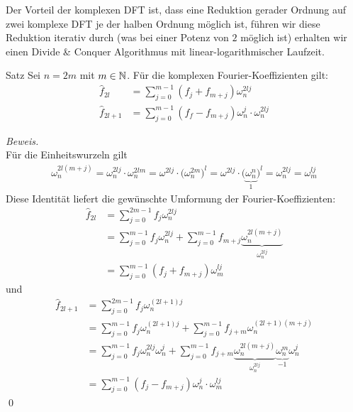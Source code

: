 Der Vorteil der komplexen DFT ist, dass eine Reduktion gerader Ordnung auf zwei komplexe DFT je der halben
Ordnung möglich ist, führen wir diese Reduktion iterativ durch (was bei einer Potenz von $2$ möglich ist) 
erhalten wir einen Divide \& Conquer Algorithmus mit linear-logarithmischer Laufzeit.

\begin{colbox}{Satz}
  Sei $n=2m$ mit $m\in\mathbb N$. Für die komplexen Fourier-Koeffizienten gilt:
  \begin{align*}
    \hat{f}_{2l} &= \sum_{j=0}^{m-1} (f_j+f_{m+j})\omega_n^{2lj} \\
    \hat{f}_{2l+1} &= \sum_{j=0}^{m-1} (f_f-f_{m+j})\omega_n^{j}\cdot\omega_n^{2lj}
  \end{align*}
\end{colbox}

\textit{Beweis.} \\
Für die Einheitswurzeln gilt 
%
\begin{align*}
  \omega_n^{2l(m+j)} 
  = \omega_n^{2lj}\cdot \omega_n^{2lm} 
  = \omega^{2lj}\cdot \big(\omega_n^{2m}\big)^l
  = \omega^{2lj}\cdot \big(\underbrace{\omega_n^n}_{1}\big)^l
  = \omega_n^{2lj} = \omega_m^{lj}
\end{align*}
%
Diese Identität liefert die gewünschte Umformung der Fourier-Koeffizienten:
%
\begin{align*}
  \hat{f}_{2l} 
  &= \sum_{j=0}^{2m-1}f_j\omega_n^{2lj} \\
  &= \sum_{j=0}^{m-1} f_j\omega_n^{2lj} + \sum_{j=0}^{m-1} f_{m+j}\underbrace{\omega_n^{2l(m+j)}}_{\omega_n^{2lj}} \\
  &= \sum_{j=0}^{m-1} (f_j+f_{m+j})\omega_m^{lj}
\end{align*}
und 
\begin{align*}
  \hat{f}_{2l+1} &= \sum_{j=0}^{2m-1} f_j\omega_n^{(2l+1)j} \\
  &= \sum_{j=0}^{m-1}f_j\omega_n^{(2l+1)j} + \sum_{j=0}^{m-1} f_{j+m}\omega_n^{(2l+1)(m+j)}\\
  &= \sum_{j=0}^{m-1}f_j\omega_n^{2lj}\omega_n^j + \sum_{j=0}^{m-1} f_{j+m}
  \underbrace{\omega_n^{2l(m+j)}}_{\omega_n^{2lj}}
  \underbrace{\omega_n^{m}}_{-1}\omega_n^{j}\\
  &= \sum_{j=0}^{m-1}(f_j-f_{m+j})\omega_n^{j}\cdot\omega_m^{lj}
\end{align*}
%
\qed

